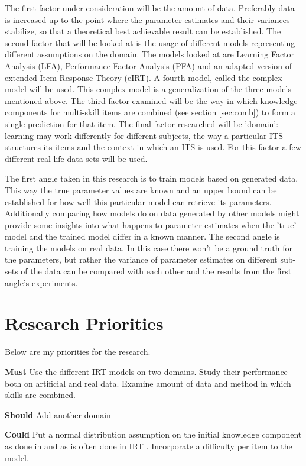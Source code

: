 \documentclass{scrartcl}
\begin{document}
The first factor under consideration will be the amount of data. Preferably data is increased up to the point where the parameter estimates and their variances stabilize, so that a theoretical best achievable result can be established. The second factor that will be looked at is the usage of different models representing different assumptions on the domain. The models looked at are Learning Factor Analysis (LFA), Performance Factor Analysis (PFA) and an adapted version of extended Item Response Theory (eIRT). A fourth model, called the complex model will be used. This complex model is a generalization of the three models mentioned above. The third factor examined will be the way in which knowledge components for multi-skill items are combined (see section \ref{sec:comb}) to form a single prediction for that item. The final factor researched will be 'domain': learning may work differently for different subjects, the way a particular ITS structures its items and the context in which an ITS is used. For this factor a few different real life data-sets will be used.

The first angle taken in this research is to train models based on generated data. This way the true parameter values are known and an upper bound can be established for how well this particular model can retrieve its parameters. Additionally comparing how models do on data generated by other models might provide some insights into what happens to parameter estimates when the 'true' model and the trained model differ in a known manner. The second angle is training the models on real data. In this case there won't be a ground truth for the parameters, but rather the variance of parameter estimates on different sub-sets of the data can be compared with each other and the results from the first angle's experiments.


\section{Research Priorities}
Below are my priorities for the research.

{\bf Must} Use the different IRT models on two domains. Study their performance both on artificial and real data. Examine amount of data and method in which skills are combined.

{\bf Should} Add another domain

{\bf Could} Put a normal distribution assumption on the initial knowledge component as done in \cite{blackart} and as is often done in IRT \cite{irtest}. Incorporate a difficulty per item to the model.
\end{document}
